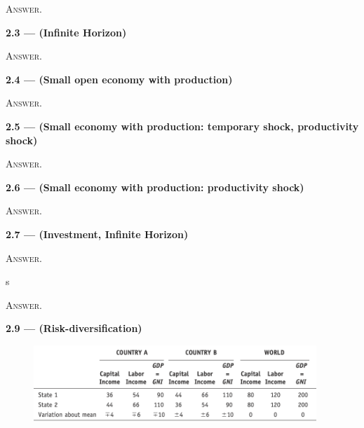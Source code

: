 \documentclass[11pt, a4paper]{article}
\begin{document}
\dotfill

\textsc{Answer.}

\clearpage
\textbf{2.3 — (Infinite Horizon)}

\dotfill

\textsc{Answer.}

\clearpage
\textbf{2.4 — (Small open economy with production)}

\dotfill

\textsc{Answer.}

\clearpage
\textbf{2.5 — (Small economy with production: temporary shock, productivity shock)}

\dotfill

\textsc{Answer.}

\clearpage
\textbf{2.6 — (Small economy with production: productivity shock)}


\dotfill

\textsc{Answer.}

\clearpage
\textbf{2.7 — (Investment, Infinite Horizon)}

\dotfill

\textsc{Answer.}

\clearpage
s

\textsc{Answer.}

\clearpage
\textbf{2.9 — (Risk-diversification)}

\begin{figure}[!htb]
	\centering
	\includegraphics[width=0.95\textwidth]{img/ps02_risk-diversification.png}
\end{figure}
\end{document}
